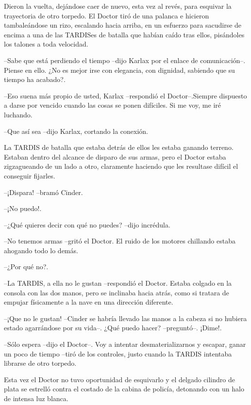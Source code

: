 Dieron la vuelta, dejándose caer de nuevo, esta vez al revés, para esquivar la trayectoria de otro torpedo. El Doctor tiró de una palanca e hicieron tambaleándose un rizo, escalando hacia arriba, en un esfuerzo para sacudirse de encima a una de las TARDISes de batalla que habían caído tras ellos, pisándoles los talones a toda velocidad.



--Sabe que está perdiendo el tiempo --dijo Karlax por el enlace de comunicación--. Piense en ello. ¿No es mejor irse con elegancia, con dignidad, sabiendo que su tiempo ha acabado?.

--Eso suena más propio de usted, Karlax --respondió el Doctor--.Siempre dispuesto a darse por vencido cuando las cosas se ponen difíciles. Si me voy, me iré luchando.

--Que así sea --dijo Karlax, cortando la conexión.



La TARDIS de batalla que estaba detrás de ellos les estaba ganando terreno. Estaban dentro del alcance de disparo de sus armas, pero el Doctor estaba zigzagueando de un lado a otro, claramente haciendo que les resultase difícil el conseguir fijarles.



--¡Dispara! --bramó Cinder.

--¡No puedo!.

--¿Qué quieres decir con qué no puedes? --dijo incrédula.

--No tenemos armas --gritó el Doctor. El ruido de los motores chillando estaba ahogando todo lo demás.

--¿Por qué no?.

--La TARDIS, a ella no le gustan --respondió el Doctor. Estaba colgado en la consola con las dos manos, pero se inclinaba hacia atrás, como si tratara de empujar físicamente a la nave en una dirección diferente.

--¡Que no le gustan! --Cinder se habría llevado las manos a la cabeza si no hubiera estado agarrándose por su vida--. ¿Qué puedo hacer? --preguntó--. ¡Dime!.

--Sólo espera --dijo el Doctor--. Voy a intentar desmaterializarnos y escapar, ganar un poco de tiempo --tiró de los controles, justo cuando la TARDIS intentaba librarse de otro torpedo.



Esta vez el Doctor no tuvo oportunidad de esquivarlo y el delgado cilindro de plata se estrelló contra el costado de la cabina de policía, detonando con un halo de intensa luz blanca.

